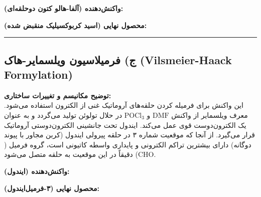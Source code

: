 \documentclass[12pt,a4paper]{article}
\begin{document}
\vspace{0.5cm}
\textbf{واکنش‌دهنده (آلفا-هالو کتون دوحلقه‌ای):}
\begin{center}
\end{center}

\vspace{1cm}
\textbf{محصول نهایی (اسید کربوکسیلیک منقبض شده):}
\begin{center}
\end{center}

\vspace{1cm}
\hrule
\vspace{1cm}

\subsection*{ج) فرمیلاسیون ویلسمایر-هاک (Vilsmeier-Haack Formylation)}
\textbf{توضیح مکانیسم و تغییرات ساختاری:} \\
این واکنش برای فرمیله کردن حلقه‌های آروماتیک غنی از الکترون استفاده می‌شود. معرف ویلسمایر از واکنش $\text{DMF}$ و $\text{POCl}_3$ در حلال تولوئن تولید می‌گردد و به عنوان یک الکترون‌دوست قوی عمل می‌کند. ایندول تحت جانشینی الکترون‌دوستی آروماتیک قرار می‌گیرد. از آنجا که موقعیت شماره ۳ در حلقه پیرولی ایندول (کربن مجاور با پیوند دوگانه) دارای بیشترین تراکم الکترونی و پایداری واسطه کاتیونی است، گروه فرمیل ($\text{CHO}$) دقیقاً در این موقعیت به حلقه متصل می‌شود.

\vspace{0.5cm}
\textbf{واکنش‌دهنده (ایندول):}
\begin{center}
\end{center}

\vspace{1cm}
\textbf{محصول نهایی (۳-فرمیل‌ایندول):}
\begin{center}
\end{center}
\end{document}
